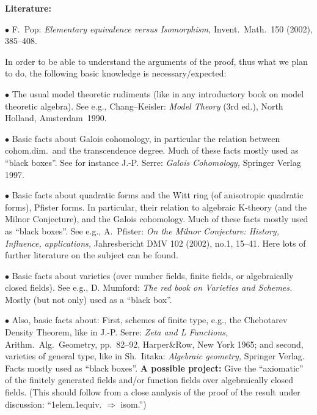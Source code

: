 \def\blt{$\bullet$}
\msn
{\bf Literature:}
\pn 
\item{\blt} F.~Pop: {\it Elementary equivalence 
versus Isomorphism,\/} Invent.\ Math.\ 150 (2002), 385--408. 
\ssn
\item{} In order to be able to understand the arguments 
of the proof, thus what we plan to do, the following 
basic knowledge is necessary/expected:
\ssn
\item{\blt} The usual model theoretic rudiments (like 
in any introductory book on model theoretic algebra). 
See e.g., Chang--Keisler: {\it Model Theory\/} (3rd ed.), 
North Holland, Amsterdam~1990.  
\ssn
\item{\blt} Basic facts about Galois cohomology, in particular 
the relation between cohom.dim.\ and the transcendence degree. 
Much of these facts mostly used as ``black boxes''. See for 
instance J.-P. Serre: {\it Galois Cohomology,\/} Springer 
Verlag 1997.
\ssn
\item{\blt} Basic facts about quadratic forms and the Witt 
ring (of anisotropic quadratic forms), Pfister forms. In 
particular, their relation to algebraic K-theory (and 
the Milnor Conjecture), and the Galois cohomology. Much 
of these facts mostly used as ``black boxes''. See e.g., 
A.~Pfister: {\it On the Milnor Conjecture: History, 
Influence, applications,\/} Jahresbericht DMV 102 (2002), 
no.1, 15--41. Here lots of further literature on the 
subject can be found.
\ssn
\item{\blt} Basic facts about varieties (over number fields,
finite fields, or algebraically closed fields). See
e.g., D. Mumford: {\it The red book on Varieties and 
Schemes.\/} Mostly (but not only) used as a ``black box''.
\ssn
\item{\blt} Also, basic facts about: First, schemes of finite 
type, e.g., the Chebotarev Density Theorem, like in 
J.-P. Serre: {\it Zeta and L Functions,\/} Arithm.\ Alg.\ 
Geometry, pp.~82--92, Harper\&Row, New York 1965; and 
second, varieties of general type, like in Sh.~Iitaka: 
{\it Algebraic geometry,\/} Springer Verlag. Facts mostly 
used as ``black boxes''.
\ssn
\msn
{\bf A possible project:} Give the ``axiomatic'' of the 
finitely generated fields and/or function fields over 
algebraically closed fields. (This should follow from a
close analysis of the proof of the result under discussion:
``\hhb1elem.\hhb1equiv. $\Rightarrow$ isom.'') 

\bye

